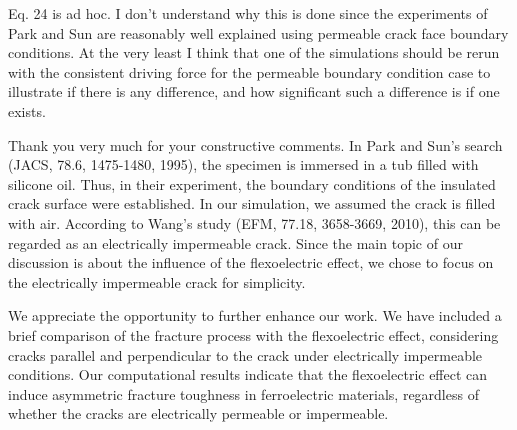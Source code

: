 \documentclass[12pt,fleqn]{article}
\begin{document}
\begin{question}{}\label{R1:Q5}
Eq. 24 is ad hoc. I don't understand why this is done since the experiments of Park and Sun are reasonably well explained using permeable crack face boundary conditions. At the very least I think that one of the simulations should be rerun with the consistent driving force for the permeable boundary condition case to illustrate if there is any difference, and how significant such a difference is if one exists.    
\end{question}

\begin{response}
Thank you very much for your constructive comments. In Park and Sun’s search (JACS, 78.6, 1475-1480, 1995), the specimen is immersed in a tub filled with silicone oil. Thus, in their experiment, the boundary conditions of the insulated crack surface were established. In our simulation, we assumed the crack is filled with air. According to Wang's study (EFM, 77.18, 3658-3669, 2010), this can be regarded as an electrically impermeable crack. Since the main topic of our discussion is about the influence of the flexoelectric effect, we chose to focus on the electrically impermeable crack for simplicity.

We appreciate the opportunity to further enhance our work. We have included a brief comparison of the fracture process with the flexoelectric effect, considering cracks parallel and perpendicular to the crack under electrically impermeable conditions. Our computational results indicate that the flexoelectric effect can induce asymmetric fracture toughness in ferroelectric materials, regardless of whether the cracks are electrically permeable or impermeable.


\end{response}
\end{document}
